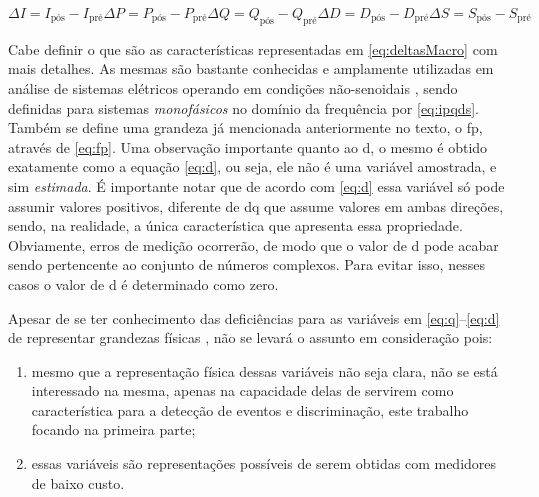 \begin{subequations} \label{eq:deltasMacro}
\begin{equation} \label{eq:dI}
\Delta I = I_{\text{pós}} - I_{\text{pré}}
\end{equation}
\begin{equation} \label{eq:dP}
\Delta P = P_{\text{pós}} - P_{\text{pré}}
\end{equation}
\begin{equation} \label{eq:dQ}
\Delta Q = Q_{\text{pós}} - Q_{\text{pré}}
\end{equation}
\begin{equation} \label{eq:dD}
\Delta D = D_{\text{pós}} - D_{\text{pré}}
\end{equation}
\begin{equation} \label{eq:dS}
\Delta S = S_{\text{pós}} - S_{\text{pré}}
\end{equation}
\end{subequations}

Cabe definir o que são as características representadas em
\ref{eq:deltasMacro} com mais detalhes. As mesmas são bastante
conhecidas e amplamente utilizadas em análise de sistemas elétricos
operando em condições não-senoidais \cite{akagi2007instantaneous},
sendo definidas para sistemas \emph{monofásicos} no domínio da
frequência por \ref{eq:ipqds}. Também se define uma grandeza já
mencionada anteriormente no texto, o \gls{fp}, através de \ref{eq:fp}.
Uma observação importante quanto ao \acs{d}, o mesmo é obtido
exatamente como a equação \ref{eq:d}, ou seja, ele não é uma
variável amostrada, e sim \emph{estimada}. É importante notar que de
acordo com \ref{eq:d} essa variável só pode assumir valores positivos,
diferente de \acs{dq} que assume valores em ambas direções, sendo, na
realidade, a única característica que apresenta essa propriedade.
Obviamente, erros de medição ocorrerão, de modo que o valor de
\acs{d} pode acabar sendo pertencente ao conjunto de números complexos.
Para evitar isso, nesses casos o valor de \acs{d} é determinado como
zero.

Apesar de se ter conhecimento das deficiências para as variáveis em
\ref{eq:q}--\ref{eq:d} de representar grandezas físicas \cite[cap.
2]{akagi2007instantaneous}, não se levará o assunto em consideração
pois:

\begin{enumerate}
\item mesmo que a representação física dessas variáveis não seja clara,
não se está interessado na mesma, apenas na capacidade delas de
servirem como característica para a detecção de eventos e
discriminação, este trabalho focando na primeira parte;
\item essas variáveis são representações possíveis de serem obtidas com
medidores de baixo custo.
\end{enumerate}

